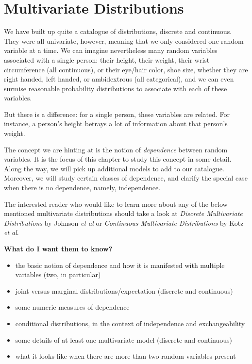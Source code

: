 \chapter{Multivariate Distributions}
\label{sec-7}

\noindent
We have built up quite a catalogue of distributions, discrete and
continuous. They were all univariate, however, meaning that we only
considered one random variable at a time. We can imagine nevertheless
many random variables associated with a single person: their height,
their weight, their wrist circumference (all continuous), or their
eye/hair color, shoe size, whether they are right handed, left handed,
or ambidextrous (all categorical), and we can even surmise reasonable
probability distributions to associate with each of these variables.

But there is a difference: for a single person, these variables are
related. For instance, a person's height betrays a lot of information
about that person's weight.

The concept we are hinting at is the notion of \emph{dependence} between
random variables. It is the focus of this chapter to study this
concept in some detail. Along the way, we will pick up additional
models to add to our catalogue. Moreover, we will study certain
classes of dependence, and clarify the special case when there is no
dependence, namely, independence.

The interested reader who would like to learn more about any of the
below mentioned multivariate distributions should take a look at
\emph{Discrete Multivariate Distributions} by Johnson \emph{et
al}\cite{Johnson1997} or \emph{Continuous Multivariate Distributions}
\cite{Kotz2000} by Kotz \emph{et al}.

\textbf{What do I want them to know?}
\begin{itemize}
\item the basic notion of dependence and how it is manifested with
multiple variables (two, in particular)
\item joint versus marginal distributions/expectation (discrete and
continuous)
\item some numeric measures of dependence
\item conditional distributions, in the context of independence and
exchangeability
\item some details of at least one multivariate model (discrete and
continuous)
\item what it looks like when there are more than two random variables
present
\end{itemize}

